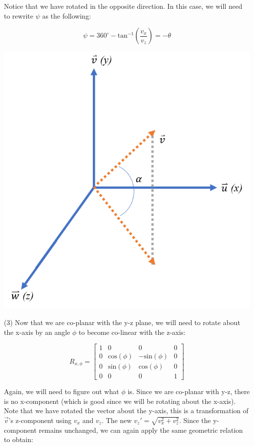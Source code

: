 \documentclass[12pt,letterpaper]{article}
\begin{document}
Notice that we have rotated in the opposite direction. In this case, we will need to rewrite $\psi$ as the following:

\begin{equation}
    \psi = 360^{\circ}-\text{tan}^{-1}(\frac{v_x}{v_z}) = -\theta
\end{equation}

\begin{center}
\includegraphics[scale=0.75]{rot3}
\end{center}

(3) Now that we are co-planar with the y-z plane, we will need to rotate about the x-axis by an angle $\phi$ to become co-linear with the z-axis:

\begin{equation}
    R_{x, \phi} = \begin{bmatrix}
        1 & 0 & 0 & 0 \\
        0 & \text{cos}(\phi) & -\text{sin}(\phi) & 0 \\
        0 & \text{sin}(\phi) &  \text{cos}(\phi) & 0 \\
        0 & 0 & 0 & 1
    \end{bmatrix}
\end{equation}

Again, we will need to figure out what $\phi$ is. Since we are co-planar with y-z, there is no x-component (which is good since we will be rotating about the x-axis). Note that we have rotated the vector about the y-axis, this is a transformation of $\overrightarrow{v}$'s z-component using $v_x$ and $v_z$. The new $v_z' = \sqrt{v_x^2+v_z^2}$. Since the y-component remains unchanged, we can again apply the same geometric relation to obtain:
\end{document}
